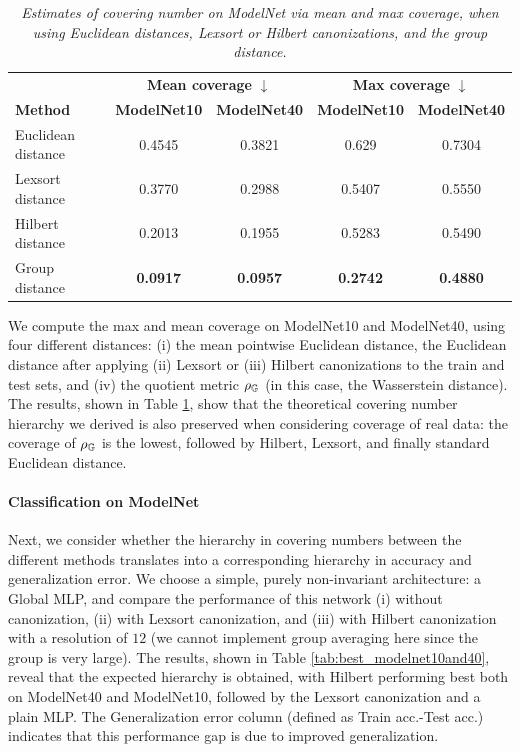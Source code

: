 \documentclass{article}
\begin{document}
\begin{table}[h]
\centering
\caption{\it Estimates of covering number on ModelNet via mean and max coverage, when using Euclidean distances, Lexsort or Hilbert canonizations, and the group distance.}
\label{tab:distances_both}
\begin{tabular}{lcccc}
\toprule
 & \multicolumn{2}{c}{\textbf{Mean coverage} $\downarrow$} 
 & \multicolumn{2}{c}{\textbf{Max coverage} $\downarrow$} \\
\textbf{Method} 
& \textbf{ModelNet10} 
& \textbf{ModelNet40} 
& \textbf{ModelNet10} 
& \textbf{ModelNet40} \\
\midrule
Euclidean distance & 0.4545 & 0.3821 & 0.629  & 0.7304 \\
Lexsort distance    & 0.3770 & 0.2988 & 0.5407 & 0.5550 \\
Hilbert distance & 0.2013 & 0.1955 & 0.5283 & 0.5490 \\
Group distance   & \textbf{0.0917} & \textbf{0.0957} & \textbf{0.2742} & \textbf{0.4880} \\
\bottomrule
\end{tabular}
\end{table}

We compute the max and mean coverage on ModelNet10 and ModelNet40, using four different distances: (i) the mean pointwise Euclidean distance,  the Euclidean distance after applying (ii) Lexsort or (iii) Hilbert canonizations to the train and test sets, and (iv) the quotient metric $\rho_{\mathbb{G}} $ (in this case, the Wasserstein distance). The results, shown in Table \ref{tab:distances_both}, show that the theoretical covering number hierarchy we derived is also preserved when considering coverage of real data: the coverage of  $\rho_{\mathbb{G}} $ is the lowest, followed by Hilbert, Lexsort, and finally standard Euclidean distance. 

\paragraph{Classification on ModelNet} Next, we consider whether the hierarchy in covering numbers between the different methods translates into a corresponding hierarchy in accuracy and generalization error. We choose a simple, purely non-invariant architecture: a Global MLP, and compare the performance of this network (i) without canonization, (ii) with Lexsort canonization, and (iii) with Hilbert canonization with a resolution of $12$ (we cannot implement group averaging here since the group is very large). The results, shown in Table \ref{tab:best_modelnet10and40}, reveal that the expected hierarchy is obtained, with Hilbert performing best both on ModelNet40 and ModelNet10, followed by the Lexsort canonization and a plain MLP. The Generalization error column (defined as Train acc.-Test acc.) indicates that this performance gap is due to improved generalization.  
\end{document}

